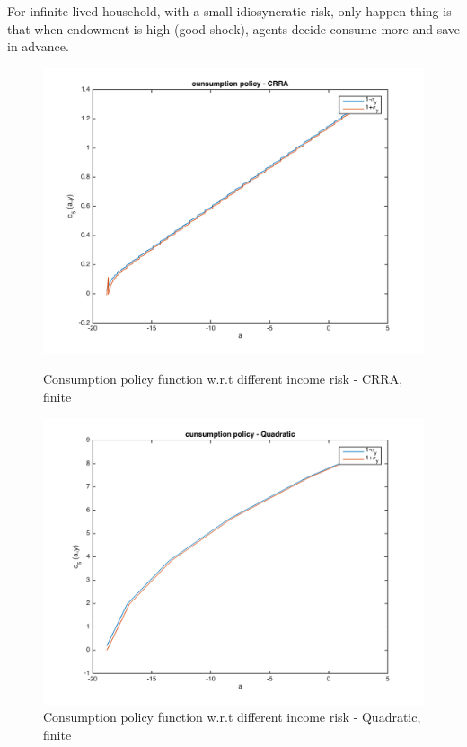 \documentclass{article}[a4paper]
\begin{document}
For infinite-lived household, with a small idiosyncratic risk, only happen thing is that when endowment is high (good shock), agents decide consume more and save in advance.
\begin{figure}[htbp]
\centering
\begin{minipage}[t]{0.48\textwidth}
\includegraphics[width=\textwidth]{img/41fa.png}
\caption{Consumption policy function w.r.t different income risk - CRRA, finite}\label{fig41fa}
\end{minipage}
\begin{minipage}[t]{0.48\textwidth}
\centering
\includegraphics[width=\textwidth]{img/41qa.png}
\caption{Consumption policy function w.r.t different income risk - Quadratic, finite}\label{fig41qa}
\end{minipage}
\end{figure}
\end{document}
